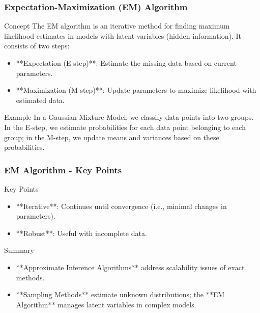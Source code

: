 \documentclass[aspectratio=169]{beamer}
\begin{document}
\begin{frame}[fragile]
  \frametitle{Expectation-Maximization (EM) Algorithm}
  \begin{block}{Concept}
    The EM algorithm is an iterative method for finding maximum likelihood estimates in models with latent variables (hidden information). It consists of two steps:
    \begin{itemize}
      \item **Expectation (E-step)**: Estimate the missing data based on current parameters.
      \item **Maximization (M-step)**: Update parameters to maximize likelihood with estimated data.
    \end{itemize}
  \end{block}

  \begin{block}{Example}
    In a Gaussian Mixture Model, we classify data points into two groups. In the E-step, we estimate probabilities for each data point belonging to each group; in the M-step, we update means and variances based on these probabilities.
  \end{block}
\end{frame}

\begin{frame}[fragile]
  \frametitle{EM Algorithm - Key Points}
  \begin{block}{Key Points}
    \begin{itemize}
      \item **Iterative**: Continues until convergence (i.e., minimal changes in parameters).
      \item **Robust**: Useful with incomplete data.
    \end{itemize}
  \end{block}

  \begin{block}{Summary}
    \begin{itemize}
      \item **Approximate Inference Algorithms** address scalability issues of exact methods.
      \item **Sampling Methods** estimate unknown distributions; the **EM Algorithm** manages latent variables in complex models.
    \end{itemize}
  \end{block}
\end{frame}
\end{document}
